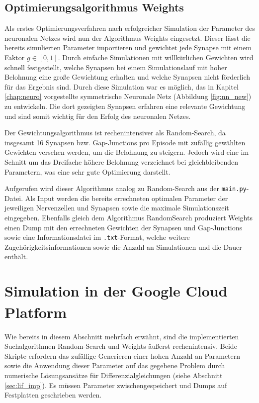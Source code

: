 	\subsection{Optimierungsalgorithmus Weights}
		Als erstes Optimierungsverfahren nach erfolgreicher Simulation der Parameter des neuronalen Netzes wird nun der Algorithmus Weights eingesetzt. Dieser lässt die bereits simulierten Parameter importieren und gewichtet jede Synapse mit einem Faktor $g\in[0,1]$. Durch einfache Simulationen mit willkürlichen Gewichten wird schnell festgestellt, welche Synapsen bei einem Simulationslauf mit hoher Belohnung eine große Gewichtung erhalten und welche Synapsen nicht förderlich für das Ergebnis sind. Durch diese Simulation war es möglich, das in Kapitel \ref{chap:neuro} vorgestellte symmetrische Neuronale Netz (Abbildung \ref{fig:nn_new}) zu entwickeln. Die dort gezeigten Synapsen erfahren eine relevante Gewichtung und sind somit wichtig für den Erfolg des neuronalen Netzes.
		
		Der Gewichtungsalgorithmus ist rechenintensiver als Random-Search, da insgesamt 16 Synapsen bzw. Gap-Junctions pro Episode mit zufällig gewählten Gewichten versehen werden, um die Belohnung zu steigern. Jedoch wird eine im Schnitt um das Dreifache höhere Belohnung verzeichnet bei gleichbleibenden Parametern, was eine sehr gute Optimierung darstellt.
		
		Aufgerufen wird dieser Algorithmus analog zu Random-Search aus der \texttt{main.py}-Datei. Als Input werden die bereits errechneten optimalen Parameter der jeweiligen Nervenzellen und Synapsen sowie die maximale Simulationszeit eingegeben. Ebenfalls gleich dem Algorithmus RandomSearch produziert Weights einen Dump mit den errechneten Gewichten der Synapsen und Gap-Junctions sowie eine Informationsdatei im \texttt{.txt}-Format, welche weitere Zugehörigkeitsinformationen sowie die Anzahl an Simulationen und die Dauer enthält.
		
	\section{Simulation in der Google Cloud Platform\textsuperscript{\textregistered}}
	Wie bereits in diesem Abschnitt mehrfach erwähnt, sind die implementierten Suchalgorithmen Random-Search und Weights äußerst rechenintensiv. Beide Skripte erfordern das zufällige Generieren einer hohen Anzahl an Parametern sowie die Anwendung dieser Parameter auf das gegebene Problem durch numerische Lösungsansätze für Differenzialgleichungen (siehe Abschnitt \ref{sec:lif_imp}). Es müssen Parameter zwischengespeichert und Dumps auf Festplatten geschrieben werden.
	
